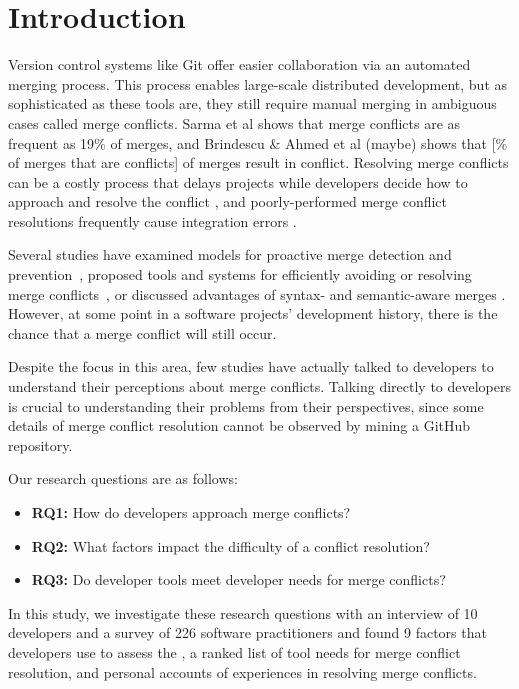 \section{Introduction}\label{introduction}


Version control systems like Git offer easier collaboration via an automated merging process. This process enables large-scale distributed development, but as sophisticated as these tools are, they still require manual merging in ambiguous cases called merge conflicts. Sarma et al \cite{cassandra} shows that merge conflicts are as frequent as 19\% of merges, and Brindescu \& Ahmed et al (maybe) shows that [\% of merges that are conflicts] of merges result in conflict. Resolving merge conflicts can be a costly process that delays projects while developers decide how to approach and resolve the conflict \cite{cassandra}, and poorly-performed merge conflict resolutions frequently cause integration errors \cite{bird-branches-conflict}.


Several studies have examined models for proactive merge detection and prevention~\cite{Brun2011}\cite{palantir}\cite{Guimaraes}, proposed tools and systems for efficiently avoiding or resolving merge conflicts~\cite{nishimura}\cite{mens2002state}, or discussed advantages of syntax- and semantic-aware merges \cite{danny_refactorings}\cite{hunt2002extensible}. However, at some point in a software projects' development history, there is the chance that a merge conflict will still occur. 


Despite the focus in this area, few studies have actually talked to developers to understand their perceptions about merge conflicts. Talking directly to developers is crucial to understanding their problems from their perspectives, since some details of merge conflict resolution cannot be observed by mining a GitHub repository. 

Our research questions are as follows:
\begin{itemize}
\item\textbf{RQ1:} How do developers approach merge conflicts?\\
\item\textbf{RQ2:} What factors impact the difficulty of a conflict resolution?\\
\item\textbf{RQ3:} Do developer tools meet developer needs for merge conflicts?\\
\end{itemize}

In this study, we investigate these research questions with an interview of 10 developers and a survey of 226 software practitioners and found 9 factors that developers use to assess the , a ranked list of tool needs for merge conflict resolution, and personal accounts of experiences in resolving merge conflicts.
